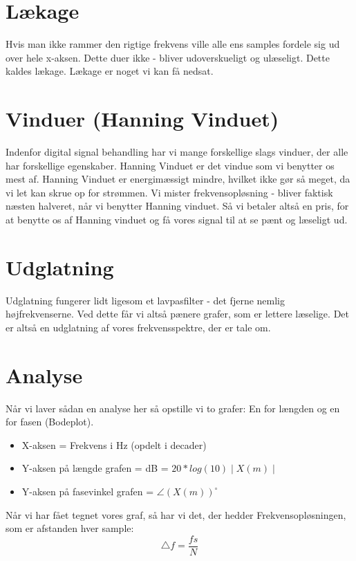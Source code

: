 \documentclass[12pt, letterpaper]{article}
\begin{document}
\section{Lækage}
Hvis man ikke rammer den rigtige frekvens ville alle ens samples fordele sig ud over hele x-aksen. Dette duer ikke - bliver udoverskueligt og ulæseligt. Dette kaldes lækage. Lækage er noget vi kan få nedsat. 

\section{Vinduer (Hanning Vinduet)}
Indenfor digital signal behandling har vi mange forskellige slags vinduer, der alle har forskellige egenskaber. 
Hanning Vinduet er det vindue som vi benytter os mest af. 
Hanning Vinduet er energimæssigt mindre, hvilket ikke gør så meget, da vi let kan skrue op for strømmen. 
Vi mister frekvensopløsning - bliver faktisk næsten halveret, når vi benytter Hanning vinduet. Så vi betaler altså en pris, for at benytte os af Hanning vinduet og få vores signal til at se pænt og læseligt ud. 

\section{Udglatning}
Udglatning fungerer lidt ligesom et lavpasfilter - det fjerne nemlig højfrekvenserne. 
Ved dette får vi altså pænere grafer, som er lettere læselige. Det er altså en udglatning af vores frekvensspektre, der er tale om. 

\section{Analyse}

Når vi laver sådan en analyse her så opstille vi to grafer: 
En for længden og en for fasen (Bodeplot). \\

\begin{itemize}
\item X-aksen = Frekvens i Hz (opdelt i decader)
\item Y-aksen på længde grafen = dB = $ 20*log(10)\mid X(m) \mid$ 
\item Y-aksen på fasevinkel grafen = $\angle (X(m))^{\circ}  $
\end{itemize}

Når vi har fået tegnet vores graf, så har vi det, der hedder Frekvensopløsningen, som er afstanden hver sample: 
$$\bigtriangleup f = \frac{fs}{N} $$
\end{document}
